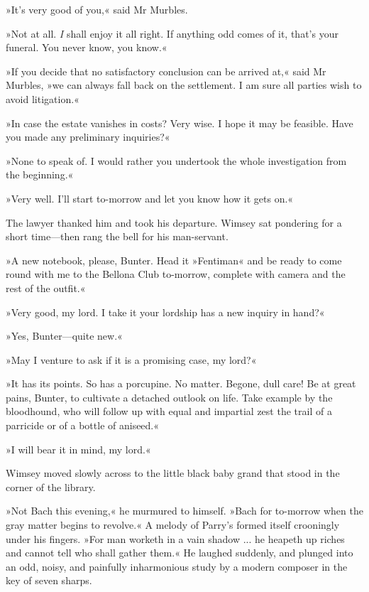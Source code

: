 »It's very good of you,« said Mr Murbles.

»Not at all. \textit{I} shall enjoy it all right. If anything odd comes of it, that's your funeral. You never know, you know.«

»If you decide that no satisfactory conclusion can be arrived at,« said Mr Murbles, »we can always fall back on the settlement. I am sure all parties wish to avoid litigation.«

»In case the estate vanishes in costs? Very wise. I hope it may be feasible. Have you made any preliminary inquiries?«

»None to speak of. I would rather you undertook the whole investigation from the beginning.«

»Very well. I'll start to-morrow and let you know how it gets on.«

The lawyer thanked him and took his departure. Wimsey sat pondering for a short time\allowbreak---\allowbreak then rang the bell for his man-servant.

»A new notebook, please, Bunter. Head it »Fentiman« and be ready to come round with me to the Bellona Club to-morrow, complete with camera and the rest of the outfit.«

»Very good, my lord. I take it your lordship has a new inquiry in hand?«

»Yes, Bunter\allowbreak---\allowbreak quite new.«

»May I venture to ask if it is a promising case, my lord?«

»It has its points. So has a porcupine. No matter. Begone, dull care! Be at great pains, Bunter, to cultivate a detached outlook on life. Take example by the bloodhound, who will follow up with equal and impartial zest the trail of a parricide or of a bottle of aniseed.«

»I will bear it in mind, my lord.«

Wimsey moved slowly across to the little black baby grand that stood in the corner of the library.

»Not Bach this evening,« he murmured to himself. »Bach for to-morrow when the gray matter begins to revolve.« A melody of Parry's formed itself crooningly under his fingers. »For man worketh in a vain shadow ... he heapeth up riches and cannot tell who shall gather them.« He laughed suddenly, and plunged into an odd, noisy, and painfully inharmonious study by a modern composer in the key of seven sharps.